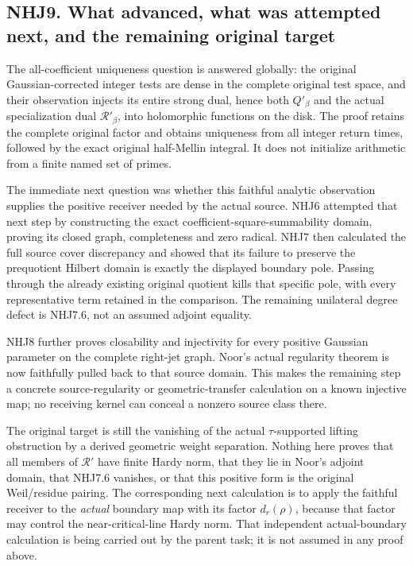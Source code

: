 \subsection{NHJ9. What advanced, what was attempted next, and the
remaining original
target}\label{nhj9.-what-advanced-what-was-attempted-next-and-the-remaining-original-target}

The all-coefficient uniqueness question is answered globally: the
original Gaussian-corrected integer tests are dense in the complete
original test space, and their observation injects its entire strong
dual, hence both \(Q'_\beta\) and the actual specialization dual
\(\mathcal R'_\beta\), into holomorphic functions on the disk. The proof
retains the complete original factor and obtains uniqueness from all
integer return times, followed by the exact original half-Mellin
integral. It does not initialize arithmetic from a finite named set of
primes.

The immediate next question was whether this faithful analytic
observation supplies the positive receiver needed by the actual source.
NHJ6 attempted that next step by constructing the exact
coefficient-square-summability domain, proving its closed graph,
completeness and zero radical. NHJ7 then calculated the full source
cover discrepancy and showed that its failure to preserve the
prequotient Hilbert domain is exactly the displayed boundary pole.
Passing through the already existing original quotient kills that
specific pole, with every representative term retained in the
comparison. The remaining unilateral degree defect is NHJ7.6, not an
assumed adjoint equality.

NHJ8 further proves closability and injectivity for every positive
Gaussian parameter on the complete right-jet graph. Noor's actual
regularity theorem is now faithfully pulled back to that source domain.
This makes the remaining step a concrete source-regularity or
geometric-transfer calculation on a known injective map; no receiving
kernel can conceal a nonzero source class there.

The original target is still the vanishing of the actual
\(\tau\)-supported lifting obstruction by a derived geometric weight
separation. Nothing here proves that all members of \(\mathcal R'\) have
finite Hardy norm, that they lie in Noor's adjoint domain, that NHJ7.6
vanishes, or that this positive form is the original Weil/residue
pairing. The corresponding next calculation is to apply the faithful
receiver to the \emph{actual} boundary map with its factor
\(d_r(\rho)\), because that factor may control the near-critical-line
Hardy norm. That independent actual-boundary calculation is being
carried out by the parent task; it is not assumed in any proof above.
